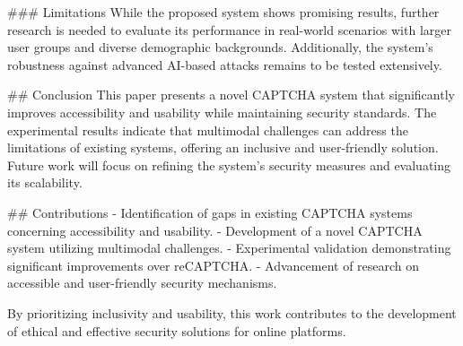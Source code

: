 ### Limitations
While the proposed system shows promising results, further research is needed to evaluate its performance in real-world scenarios with larger user groups and diverse demographic backgrounds. Additionally, the system's robustness against advanced AI-based attacks remains to be tested extensively.

## Conclusion
This paper presents a novel CAPTCHA system that significantly improves accessibility and usability while maintaining security standards. The experimental results indicate that multimodal challenges can address the limitations of existing systems, offering an inclusive and user-friendly solution. Future work will focus on refining the system's security measures and evaluating its scalability.

## Contributions
- Identification of gaps in existing CAPTCHA systems concerning accessibility and usability.
- Development of a novel CAPTCHA system utilizing multimodal challenges.
- Experimental validation demonstrating significant improvements over reCAPTCHA.
- Advancement of research on accessible and user-friendly security mechanisms.

By prioritizing inclusivity and usability, this work contributes to the development of ethical and effective security solutions for online platforms.